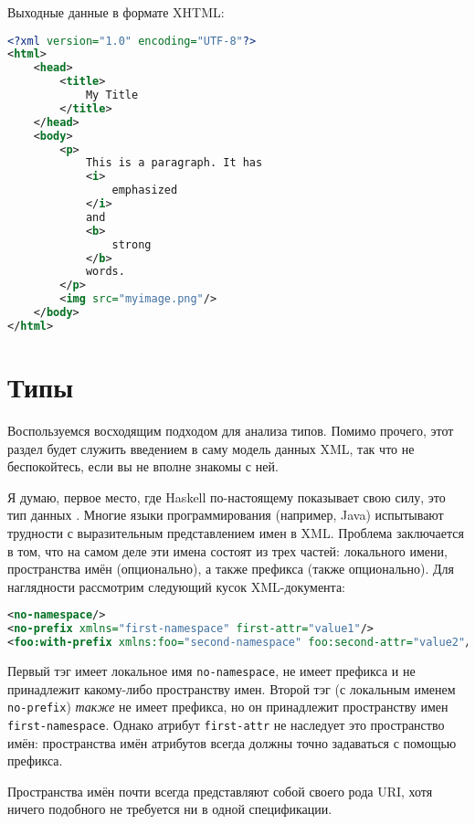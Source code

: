 Выходные данные в формате XHTML:

\begin{lstlisting}[language=XML]
<?xml version="1.0" encoding="UTF-8"?>
<html>
    <head>
        <title>
            My Title
        </title>
    </head>
    <body>
        <p>
            This is a paragraph. It has 
            <i>
                emphasized
            </i>
            and 
            <b>
                strong
            </b>
            words.
        </p>
        <img src="myimage.png"/>
    </body>
</html>
\end{lstlisting}

\section{Типы} %

Воспользуемся восходящим подходом для анализа типов. Помимо прочего, этот раздел будет служить введением в саму модель данных XML, так что не беспокойтесь, если вы не вполне знакомы с ней.

Я думаю, первое место, где Haskell по-настоящему показывает свою силу, это тип данных . Многие языки программирования (например, Java) испытывают трудности с выразительным представлением имен в XML. Проблема заключается в том, что на самом деле эти имена состоят из трех частей: локального имени, пространства имён (опционально), а также префикса (также опционально). Для наглядности рассмотрим следующий кусок XML-документа:

\begin{lstlisting}[language=XML]
<no-namespace/>
<no-prefix xmlns="first-namespace" first-attr="value1"/>
<foo:with-prefix xmlns:foo="second-namespace" foo:second-attr="value2"/>
\end{lstlisting}

Первый тэг имеет локальное имя \lstinline!no-namespace!, не имеет префикса и не принадлежит какому-либо пространству имен. Второй тэг (с локальным именем \lstinline!no-prefix!) \emph{также} не имеет префикса, но он принадлежит пространству имен \lstinline!first-namespace!. Однако атрибут \lstinline!first-attr! не наследует это пространство имён: пространства имён атрибутов всегда должны точно задаваться с помощью префикса.

\begin{remark}
Пространства имён почти всегда представляют собой своего рода URI, хотя ничего подобного не требуется ни в одной спецификации.
\end{remark}

